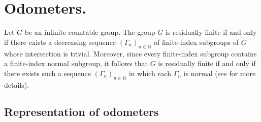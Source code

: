 \documentclass[titlepage,reqno,10pt]{amsart}
\theoremstyle{definition}
\def \Core {{\rm Core}}
\begin{document}


 




\section{Odometers.}\label{odometers}
Let $G$ be an infinite countable group. The group $G$ is residually finite if and only if there exists a decreasing sequence $(\Gamma_n)_{n \in \mathbb{N}}$ of finite-index subgroups of $G$ whose intersection is trivial. Moreover, since every finite-index subgroup contains a finite-index normal subgroup, it follows that $G$ is residually finite if and only if there exists such a sequence $(\Gamma_n)_{n \in \mathbb{N}}$ in which each $\Gamma_n$ is normal (see \cite{CeCo18} for more details).

 \subsection{Representation of odometers} \label{subsect: Representation of odometers}
 
\end{document}
